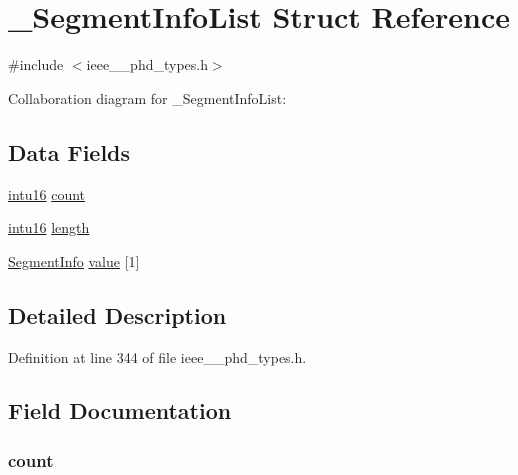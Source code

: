 \hypertarget{struct___segment_info_list}{}\section{\+\_\+\+Segment\+Info\+List Struct Reference}
\label{struct___segment_info_list}


{\ttfamily \#include $<$ieee\+\_\+\_\+phd\+\_\+types.\+h$>$}



Collaboration diagram for \+\_\+\+Segment\+Info\+List\+:
\subsection*{Data Fields}
\begin{DoxyCompactItemize}
\item 
\hyperlink{ieee__11073__phd__types_8h_a3561595d2aa7416532e1c9910abd076d}{intu16} \hyperlink{struct___segment_info_list_abf6db060ae8e224764b0f867fb135ecd}{count}
\item 
\hyperlink{ieee__11073__phd__types_8h_a3561595d2aa7416532e1c9910abd076d}{intu16} \hyperlink{struct___segment_info_list_a3743679e4ff85e3e1b3fc2e59973fbb3}{length}
\item 
\hyperlink{ieee__11073__phd__types_8h_afaaeb80fc309a7f6397002e14e138519}{Segment\+Info} \hyperlink{struct___segment_info_list_ac2a01f3b46a4bfa439ae28dbbc0013d3}{value} \mbox{[}1\mbox{]}
\end{DoxyCompactItemize}


\subsection{Detailed Description}


Definition at line 344 of file ieee\+\_\+\_\+phd\+\_\+types.\+h.



\subsection{Field Documentation}
\hypertarget{struct___segment_info_list_abf6db060ae8e224764b0f867fb135ecd}{}
\subsubsection[{count}]{ count}\label{struct___segment_info_list_abf6db060ae8e224764b0f867fb135ecd}


